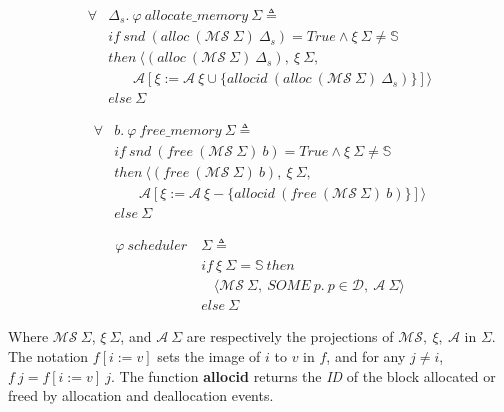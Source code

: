 \begin{definition} 
\end{definition}
\vspace{-7pt}
\begin{align*}
\forall &\Delta_s.\ \varphi\ allocate\_memory\ \Sigma \triangleq\\
&if\ snd\ (alloc\ (\mathcal{MS}\ \Sigma)\ \Delta_s) = True \wedge \xi\ \Sigma \neq \mathbb{S}\\
&then\ \langle (alloc\ (\mathcal{MS}\ \Sigma)\ \Delta_s),\ \xi\ \Sigma,\\
&\ \ \ \ \ \ \ \ \mathcal{A}[\xi := \mathcal{A}\ \xi \cup \lbrace allocid\ (alloc\ (\mathcal{MS}\ \Sigma)\ \Delta_s) \rbrace] \rangle\\
&else\ \Sigma
\end{align*}
\vspace{-12pt}

\begin{definition} 
\end{definition}
\vspace{-7pt}	
\begin{align*}
\forall &b.\ \varphi\ free\_memory\ \Sigma \triangleq\\ 
&if\ snd\ (free\ (\mathcal{MS}\ \Sigma)\ b) = True \wedge \xi\ \Sigma \neq \mathbb{S}\\
&then\ \langle (free\ (\mathcal{MS}\ \Sigma)\ b),\ \xi\ \Sigma,\\
&\ \ \ \ \ \ \ \ \mathcal{A}[\xi := \mathcal{A}\ \xi - \lbrace allocid\ (free\ (\mathcal{MS}\ \Sigma)\ b) \rbrace] \rangle\\
&else\ \Sigma
\end{align*}
\vspace{-12pt}

\begin{definition} [Scheduler]
\end{definition}
\vspace{-7pt}	
\begin{align*}
\varphi\ scheduler\ &\Sigma \triangleq\\
&if\ \xi\ \Sigma = \mathbb{S}\ then\\
&\ \ \ \ \langle \mathcal{MS}\ \Sigma,\ SOME\ p.\ p \in \mathcal{D},\ \mathcal{A}\ \Sigma \rangle\\
&else\ \Sigma
\end{align*}
\vspace{-12pt}

Where $\mathcal{MS}\ \Sigma$, $\xi\ \Sigma$, and $\mathcal{A}\ \Sigma$ are respectively the projections of $\mathcal{MS},\ \xi,\ \mathcal{A}$ in $\Sigma$. The notation $f[i:=v]$ sets the image of $i$ to $v$ in $f$, and for any $j\neq i$, $f\ j = f[i:=v]\ j$. The function \textbf{allocid} returns the \emph{ID} of the block allocated or freed by allocation and deallocation events.

